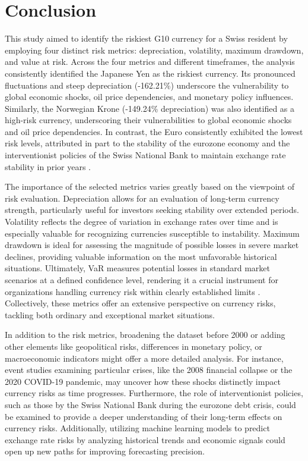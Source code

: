 \documentclass[11pt,a4paper,english,oneside]{book}
\begin{document}
\chapter{Conclusion}
This study aimed to identify the riskiest G10 currency for a Swiss resident by employing four distinct risk metrics: depreciation, volatility, maximum drawdown, and value at risk. Across the four metrics and different timeframes, the analysis consistently identified the Japanese Yen as the riskiest currency. Its pronounced fluctuations and steep depreciation (-162.21\%) underscore the vulnerability to global economic shocks, oil price dependencies, and monetary policy influences. Similarly, the Norwegian Krone (-149.24\% depreciation) was also identified as a high-risk currency, underscoring their vulnerabilities to global economic shocks and oil price dependencies. In contrast, the Euro consistently exhibited the lowest risk levels, attributed in part to the stability of the eurozone economy and the interventionist policies of the Swiss National Bank to maintain exchange rate stability in prior years \parencite{auer2015safe}.

The importance of the selected metrics varies greatly based on the viewpoint of risk evaluation. Depreciation allows for an evaluation of long-term currency strength, particularly useful for investors seeking stability over extended periods. Volatility reflects the degree of variation in exchange rates over time and is especially valuable for recognizing currencies susceptible to instability. Maximum drawdown is ideal for assessing the magnitude of possible losses in severe market declines, providing valuable information on the most unfavorable historical situations. Ultimately, VaR measures potential losses in standard market scenarios at a defined confidence level, rendering it a crucial instrument for organizations handling currency risk within clearly established limits \parencite{hull2012risk}. Collectively, these metrics offer an extensive perspective on currency risks, tackling both ordinary and exceptional market situations.

In addition to the risk metrics, broadening the dataset before 2000 or adding other elements like geopolitical risks, differences in monetary policy, or macroeconomic indicators might offer a more detailed analysis. For instance, event studies examining particular crises, like the 2008 financial collapse or the 2020 COVID-19 pandemic, may uncover how these shocks distinctly impact currency risks as time progresses. Furthermore, the role of interventionist policies, such as those by the Swiss National Bank during the eurozone debt crisis, could be examined to provide a deeper understanding of their long-term effects on currency risks. Additionally, utilizing machine learning models to predict exchange rate risks by analyzing historical trends and economic signals could open up new paths for improving forecasting precision.
\end{document}
